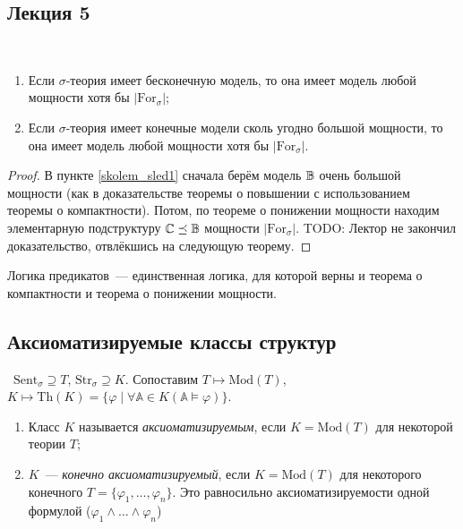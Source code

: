 \subsection{Лекция 5} 

\begin{stat} \ 
     
    \begin{enumerate}
        \item\label{skolem_sled1} Если $\sigma$-теория имеет бесконечную модель, то она имеет модель любой мощности хотя бы $|\text{For}_\sigma|$; 
        \item\label{skolem_sled2} Если $\sigma$-теория имеет конечные модели сколь угодно большой мощности, то она имеет модель любой мощности хотя бы $|\text{For}_\sigma|$. 
    \end{enumerate}
\end{stat}

\begin{proof}
    В пункте \ref{skolem_sled1} сначала берём модель ${\mathbb B}$ очень большой мощности (как в доказательстве теоремы о повышении с использованием теоремы о компактности). Потом, по теореме о понижении мощности находим элементарную подструктуру ${\mathbb C}\preceq{\mathbb B}$ мощности $|\text{For}_\sigma|$. TODO: Лектор не закончил доказательство, отвлёкшись на следующую теорему.
\end{proof} 

\begin{theorem}
    Логика предикатов~— единственная логика, для которой верны и теорема о компактности и теорема о понижении мощности.
\end{theorem}

\subsection{Аксиоматизируемые классы структур}

\begin{definition} \  
$\text{Sent}_\sigma \supseteq T$, $\text{Str}_\sigma \supseteq K$. Сопоставим $T \mapsto \text{Mod}(T)$, $K \mapsto \text{Th}(K) = \{\varphi \mid \forall \mathbb{A}\in K (\mathbb{A}\models \varphi)\}$.
    \begin{enumerate}
        \item  Класс $K$ называется \textit{аксиоматизируемым}, если $K = \text{Mod}(T)$ для некоторой теории $T$; 
        \item $K$~— \textit{конечно аксиоматизируемый}, если $K = \text{Mod}(T)$ для некоторого конечного $T = \{\varphi_1, \ldots, \varphi_n\}$. Это равносильно аксиоматизируемости одной формулой ($\varphi_1 \wedge \ldots \wedge \varphi_n$)
    \end{enumerate}
\end{definition}

